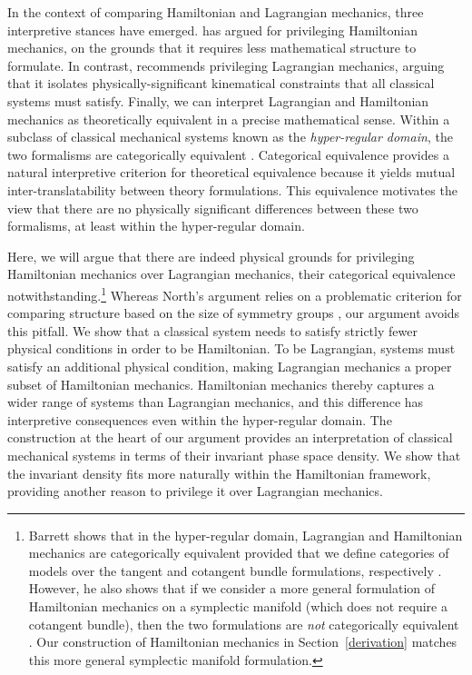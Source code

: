 \documentclass[12pt, english, twoside]{article} %
\begin{document}
In the context of comparing Hamiltonian and Lagrangian mechanics, three interpretive stances have emerged. \textcites[]{North} has argued for privileging Hamiltonian mechanics, on the grounds that it requires less mathematical structure to formulate. In contrast, \textcites[]{Curiel} recommends privileging Lagrangian mechanics, arguing that it isolates physically-significant kinematical constraints that all classical systems must satisfy. Finally, we can interpret Lagrangian and Hamiltonian mechanics as theoretically equivalent in a precise mathematical sense. Within a subclass of classical mechanical systems known as the \textit{hyper-regular domain}, the two formalisms are categorically equivalent \parencites[]{Teh}{Barrett2}. Categorical equivalence provides a natural interpretive criterion for theoretical equivalence because it yields mutual inter-translatability between theory formulations. This equivalence motivates the view that there are no physically significant differences between these two formalisms, at least within the hyper-regular domain. 

Here, we will argue that there are indeed physical grounds for privileging Hamiltonian mechanics over Lagrangian mechanics, their categorical equivalence notwithstanding.\footnote{Barrett shows that in the hyper-regular domain, Lagrangian and Hamiltonian mechanics are categorically equivalent provided that we define categories of models over the tangent and cotangent bundle formulations, respectively \parencites*[1181-82]{Barrett2}. However, he also shows that if we consider a more general formulation of Hamiltonian mechanics on a symplectic manifold (which does not require a cotangent bundle), then the two formulations are \textit{not} categorically equivalent \parencites*[1182-83]{Barrett2}. Our construction of Hamiltonian mechanics in Section~\ref{derivation} matches this more general symplectic manifold formulation.} Whereas North's argument relies on a problematic criterion for comparing structure based on the size of symmetry groups \parencites[]{Swanson}, our argument avoids this pitfall. We show that a classical system needs to satisfy strictly fewer physical conditions in order to be Hamiltonian. To be Lagrangian, systems must satisfy an additional physical condition, making Lagrangian mechanics a proper subset of Hamiltonian mechanics. Hamiltonian mechanics thereby captures a wider range of systems than Lagrangian mechanics, and this difference has interpretive consequences even within the hyper-regular domain. The construction at the heart of our argument provides an interpretation of classical mechanical systems in terms of their invariant phase space density. We show that the invariant density fits more naturally within the Hamiltonian framework, providing another reason to privilege it over Lagrangian mechanics.
\end{document}
